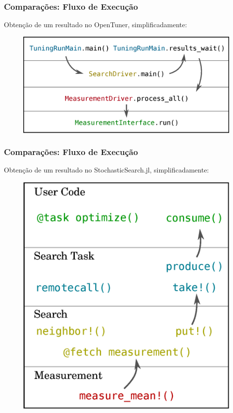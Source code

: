 \documentclass[10pt, compress]{beamer}
\begin{document}
\begin{frame}[fragile]
    \frametitle{Comparações: Fluxo de Execução}
    Obtenção de um resultado no OpenTuner, simplificadamente:
    \begin{figure}[H]
        \centering
        \includegraphics[width=.9\textwidth]{opentunerflow_simple}
    \end{figure}%
\end{frame}

\begin{frame}[fragile]
    \frametitle{Comparações: Fluxo de Execução}
    Obtenção de um resultado no StochasticSearch.jl, simplificadamente:
    \begin{figure}[H]
        \centering
        \includegraphics[width=.55\textwidth]{stochasticsearchflow_simple}
    \end{figure}%
\end{frame}
\end{document}
